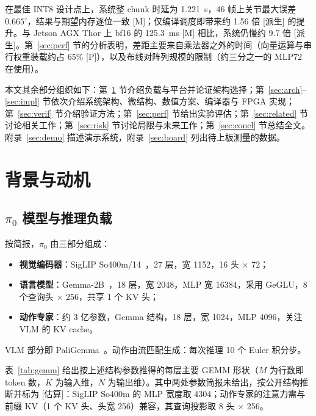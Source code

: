 \documentclass[a4paper,10.5pt]{ctexart}
\newcommand{\tM}{\textsf{[M]}}              %
\newcommand{\tP}{\textsf{[P]}}              %
\newcommand{\tD}{\textsf{[派生]}}           %
\newcommand{\tE}{\textsf{[估算]}}           %
\newcommand{\pizero}{$\pi_0$}
\begin{document}
在最佳 INT8 设计点上，系统整 chunk 时延为 1.221~s，46 帧上关节最大误差 $0.665^\circ$，结果与期望内存逐位一致 \tM；仅编译调度即带来约 1.56 倍 \tD{} 的提升。与 Jetson AGX Thor 上 bf16 的 125.3~ms \tM{} 相比，系统仍慢约 9.7 倍 \tD。第~\ref{sec:perf} 节的分析表明，差距主要来自乘法器之外的时间（向量运算与串行权重装载约占 65\% \tP），以及布线对阵列规模的限制（约三分之一的 MLP72 在使用）。

本文其余部分组织如下：第~\ref{sec:bg} 节介绍负载与平台并论证架构选择；第~\ref{sec:arch}--\ref{sec:impl} 节依次介绍系统架构、微结构、数值方案、编译器与 FPGA 实现；第~\ref{sec:verif} 节介绍验证方法；第~\ref{sec:perf} 节给出实验评估；第~\ref{sec:related} 节讨论相关工作；第~\ref{sec:risk} 节讨论局限与未来工作；第~\ref{sec:concl} 节总结全文。附录~\ref{sec:demo} 描述演示系统，附录~\ref{sec:board} 列出待上板测量的数据。


\section{背景与动机}\label{sec:bg}

\subsection{\texorpdfstring{\pizero{}}{pi0} 模型与推理负载}\label{sec:workload}

按简报，\pizero{} 由三部分组成：
\begin{itemize}
  \item \textbf{视觉编码器}：SigLIP So400m/14~\cite{siglip}，27 层，宽 1152，16 头 $\times$ 72；
  \item \textbf{语言模型}：Gemma-2B~\cite{gemma}，18 层，宽 2048，MLP 宽 16384，采用 GeGLU，8 个查询头 $\times$ 256，共享 1 个 KV 头；
  \item \textbf{动作专家}：约 3 亿参数，Gemma 结构，18 层，宽 1024，MLP 4096，关注 VLM 的 KV cache。
\end{itemize}
VLM 部分即 PaliGemma~\cite{paligemma}。动作由流匹配生成：每次推理 10 个 Euler 积分步。

表~\ref{tab:gemm} 给出按上述结构参数推得的每层主要 GEMM 形状（$M$ 为行数即 token 数，$K$ 为输入维，$N$ 为输出维）。其中两处参数简报未给出，按公开结构推断并标为 \tE：SigLIP So400m 的 MLP 宽度取 4304；动作专家的注意力需与前缀 KV（1 个 KV 头、头宽 256）兼容，其查询投影取 8 头 $\times$ 256。
\end{document}
